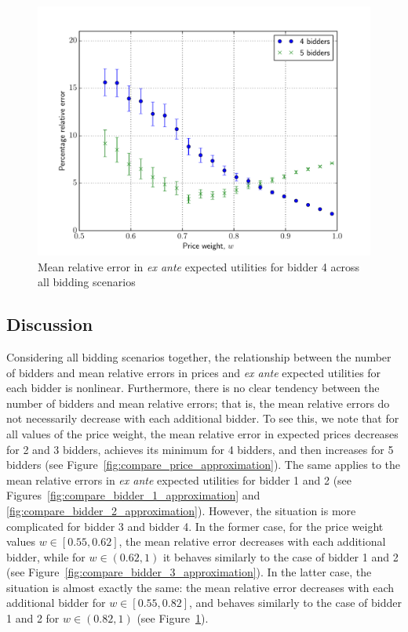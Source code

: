 \begin{figure}[t!]
  \includegraphics[width=\figsize]{Approximation/Figures/compare_bidder_4}
  \caption{Mean relative error in \emph{ex ante} expected utilities for bidder 4 across all bidding scenarios}
  \label{fig:compare_bidder_4_approximation}
\end{figure}

\subsection{Discussion} %
\label{sub:discussion_approximation}
Considering all bidding scenarios together, the relationship between the number of bidders and mean relative errors in prices and \emph{ex ante} expected utilities for each bidder is nonlinear. Furthermore, there is no clear tendency between the number of bidders and mean relative errors; that is, the mean relative errors do not necessarily decrease with each additional bidder. To see this, we note that for all values of the price weight, the mean relative error in expected prices decreases for 2 and 3 bidders, achieves its minimum for 4 bidders, and then increases for 5 bidders (see Figure~\ref{fig:compare_price_approximation}). The same applies to the mean relative errors in \emph{ex ante} expected utilities for bidder 1 and 2 (see Figures~\ref{fig:compare_bidder_1_approximation} and \ref{fig:compare_bidder_2_approximation}). However, the situation is more complicated for bidder 3 and bidder 4. In the former case, for the price weight values $w\in[0.55, 0.62]$, the mean relative error decreases with each additional bidder, while for $w\in(0.62, 1)$ it behaves similarly to the case of bidder 1 and 2 (see Figure~\ref{fig:compare_bidder_3_approximation}). In the latter case, the situation is almost exactly the same: the mean relative error decreases with each additional bidder for $w\in[0.55, 0.82]$, and behaves similarly to the case of bidder 1 and 2 for $w\in(0.82, 1)$ (see Figure~\ref{fig:compare_bidder_4_approximation}).

